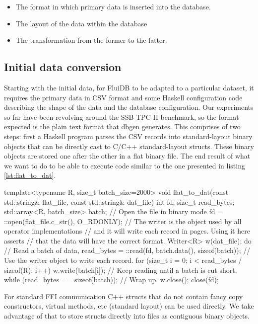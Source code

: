 \begin{itemize}
\item The format in which primary data is inserted into the database.
\item The layout of the data within the database
\item The transformation from the former to the latter.
\end{itemize}

\subsection{Initial data conversion}

Starting with the initial data, for FluiDB to be adapted to a
particular dataset, it requires the primary data in CSV format and
some Haskell configuration code describing the shape of the data and
the database configuration. Our experiments so far have been revolving
around the SSB TPC-H benchmark, so the format expected is the plain
text format that dbgen \cite{perivolaropoulosFakedrakeSsbdbgen2021}
generates. This comprises of two steps: first a Haskell program parses
the CSV records into standard-layout binary objects that can be
directly cast to C/C++ standard-layout structs. These binary objects
are stored one after the other in a flat binary file. The end result
of what we want to do to be able to execute code similar to the one
presented in listing \ref{lst:flat_to_dat}.

\begin{code}
\begin{cppcode}
template<typename R, size_t batch_size=2000>
void flat_to_dat(const std::string& flat_file, const std::string& dat_file) {
  int fd;
  size_t read_bytes;
  std::array<R, batch_size> batch;
  // Open the file in binary mode
  fd = ::open(flat_file.c_str(), O_RDONLY);
  // The writer is the object used by all operator implementations
  // and it will write each record in pages. Using it here asserts
  // that the data will have the correct format.
  Writer<R> w(dat_file);
  do {
    // Read a batch of data,
    read_bytes = ::read(fd, batch.data(), sizeof(batch));
    // Use the writer object to write each record.
    for (size_t i = 0; i < read_bytes / sizeof(R); i++) {
      w.write(batch[i]);
    }
    // Keep reading until a batch is cut short.
  } while (read_bytes == sizeof(batch));
  // Wrap up.
  w.close();
  close(fd);
}
\end{cppcode}
  \caption{\label{lst:flat_to_dat}For standard FFI communication C++
    structs that do not contain fancy copy constructors, virtual
    methods, etc (standard layout) can be used directly. We take
    advantage of that to store structs directly into files as
    contiguous binary objects.}
\end{code}

